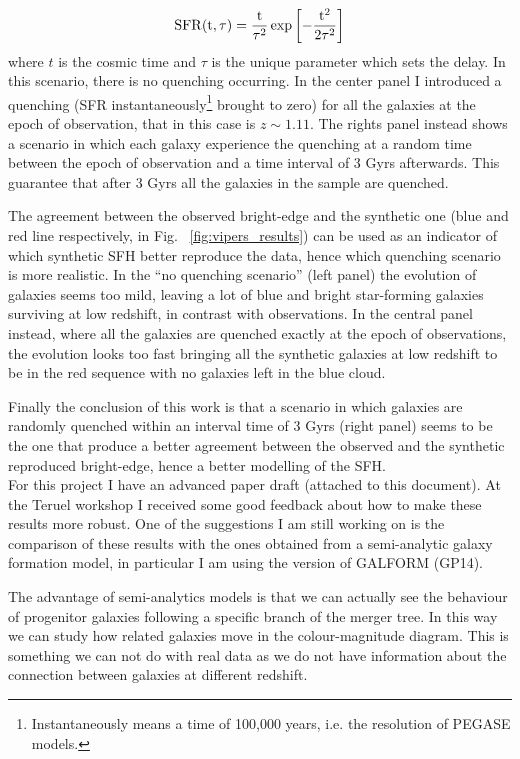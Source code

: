 \documentclass[11pt]{article}
\begin{document}
%
\begin{equation}
\label{eq:gavazzi}
\rm{SFR} (t,\tau) = \frac{t}{\tau^2}\exp{\left[-\frac{t^2}{2\tau^2}\right]}
\end{equation}
%
where $t$ is the cosmic time and $\tau$ is the unique parameter which sets the delay. In this scenario, there is no quenching occurring. In the center panel I introduced a quenching (SFR instantaneously\footnote{Instantaneously means a time of 100,000 years, i.e. the resolution of PEGASE models.} brought to zero) for all the galaxies at the epoch of observation, that in this case is $z\sim 1.11$. The rights panel instead shows a scenario in which each galaxy experience the quenching at a random time between the epoch of observation and a time interval of 3 Gyrs afterwards. This guarantee that after 3 Gyrs all the galaxies in the sample are quenched. 

The agreement between the observed bright-edge and the synthetic one (blue and red line respectively, in Fig. ~\ref{fig:vipers_results}) can be used as an indicator of which synthetic SFH better reproduce the data, hence which quenching scenario is more realistic. In the ``no quenching scenario'' (left panel) the evolution of galaxies seems too mild, leaving a lot of blue and bright star-forming galaxies surviving at low redshift, in contrast with observations. In the central panel instead, where all the galaxies are quenched exactly at the epoch of observations, the evolution looks too fast bringing all the synthetic galaxies at low redshift to be in the red sequence with no galaxies left in the blue cloud. 

Finally the conclusion of this work is that a scenario in which galaxies are randomly quenched within an interval time of 3 Gyrs (right panel) seems to be the one that produce a better agreement between the observed and the synthetic reproduced bright-edge, hence a better modelling of the SFH. \\ 

For this project I have an advanced paper draft (attached to this document). At the Teruel workshop I received some good feedback about how to make these results more robust. 
One of the suggestions I am still working on is the comparison of these results with the ones obtained from a semi-analytic galaxy formation model, in particular I am using the \cite{gonzalez14} version of  GALFORM (GP14).

The advantage of semi-analytics models is that we can actually see the behaviour of progenitor galaxies following a specific branch of the merger tree. In this way we can study how related galaxies move in the colour-magnitude diagram. This is something we can not do with real data as we do not have information about the connection between galaxies at different redshift.
\end{document}
